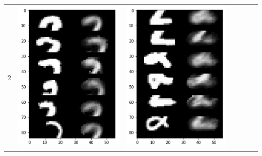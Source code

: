 \documentclass[12pt]{report} %
\begin{document}
\begin{tabular}{m{0.7cm}m{2.4cm}m{2.4cm}m{2.4cm}m{2.4cm}m{2.4cm}m{2.4cm}}
2 & \includegraphics[scale=0.3]{pictures/KE_2_up.png} & \includegraphics[scale=0.3]{pictures/KE_2_down.png} &

\end{tabular}
\end{document}
